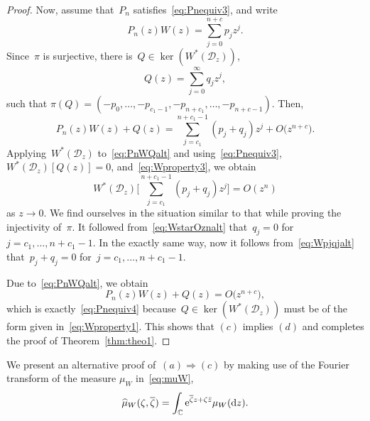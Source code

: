 \documentclass[10pt,a4paper]{article}
\numberwithin{equation}{section}
\newcommand*{\Cset}{\mathbb{C}} %
\begin{document}
\begin{proof}
 Now, assume that~$P_n$ satisfies~\eqref{eq:Pnequiv3}, and write
 \begin{equation*}
 P_n(z) W(z) = \sum_{j=0}^{n+c} p_j z^j.
 \end{equation*}
 Since~$\pi$ is surjective, there is~$Q \in \ker(W^*(\mathscr{D}_z))$,
 \begin{equation*}
 Q(z) = \sum_{j=0}^{\infty} q_j z^j,
 \end{equation*}
 such that
$
 \pi(Q) = (-p_0, \dots, -p_{c_1-1}, -p_{n+c_1}, \dots, -p_{n+c-1}).
$
 Then,
 \begin{equation}
 \label{eq:PnWQalt}
 P_n(z) W(z) + Q(z) = \sum_{j=c_1}^{n+c_1-1} (p_j + q_j) z^j + O\big(z^{n+c}\big).
 \end{equation}
 Applying~$W^*(\mathscr{D}_z)$ to~\eqref{eq:PnWQalt} and using~\eqref{eq:Pnequiv3}, $W^*(\mathscr{D}_z)[Q(z)]=0$, and~\eqref{eq:Wproperty3}, we obtain
 \begin{equation}
 \label{eq:Wpjqjalt}
 W^*(\mathscr{D}_z)\Bigg[\sum_{j=c_1}^{n+c_1-1} (p_j + q_j) z^j\bigg] = O(z^{n})
 \end{equation}
 as $z \to 0$. We find ourselves in the situation similar to that while proving the injectivity of~$\pi$. It followed from~\eqref{eq:WstarOznalt} that~$q_j = 0$ for~$j=c_1,\dots, n+c_1-1$. In the exactly same way, now it follows from~\eqref{eq:Wpjqjalt} that~$p_j+q_j = 0$ for~$j=c_1, \dots, n+c_1-1$.

 Due to~\eqref{eq:PnWQalt}, we obtain
 \begin{equation*}
 P_n(z) W(z) + Q(z) = O\big(z^{n+c}\big),
 \end{equation*}
 which is exactly~\eqref{eq:Pnequiv4} because~$Q \in \ker(W^*(\mathscr{D}_z))$ must be of the form given in~\eqref{eq:Wproperty1}. This shows that $(c)$ implies $(d)$ and completes the proof of Theorem~\ref{thm:theo1}.
 \end{proof}

 We present an alternative proof of~$(a) \Rightarrow (c)$ by making use of the Fourier transform of the measure $\mu_W$ in~\eqref{eq:muW},
 \begin{equation}
 \label{eq:muhat}
 \widehat{\mu}_W(\zeta, \overline{\zeta}) = \int_{\Cset} {\rm e}^{\overline{\zeta} z + \zeta \bar{z}} \mu_W({\rm d}z).
 \end{equation}
\end{document}
